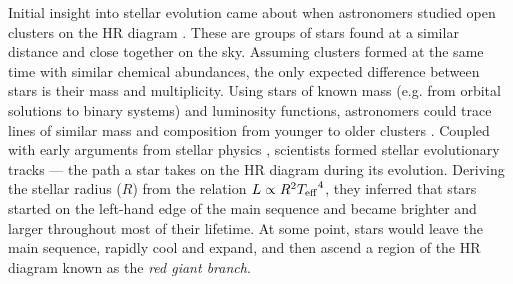 Initial insight into stellar evolution came about when astronomers studied open clusters on the HR diagram \citep{Trumpler1930}. These are groups of stars found at a similar distance and close together on the sky. Assuming clusters formed at the same time with similar chemical abundances, the only expected difference between stars is their mass and multiplicity. Using stars of known mass (e.g. from orbital solutions to binary systems) and luminosity functions, astronomers could trace lines of similar mass and composition from younger to older clusters \citep[e.g.][]{Sandage1957}. Coupled with early arguments from stellar physics \citep{Chandrasekhar1939}, scientists formed stellar evolutionary tracks --- the path a star takes on the HR diagram during its evolution. Deriving the stellar radius (\(R\)) from the relation \(L \propto R^2 {T_\mathrm{eff}}^4\), they inferred that stars started on the left-hand edge of the main sequence and became brighter and larger throughout most of their lifetime. At some point, stars would leave the main sequence, rapidly cool and expand, and then ascend a region of the HR diagram known as the \emph{red giant branch}.





